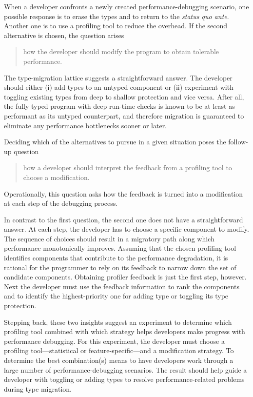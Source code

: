 
When a developer confronts a newly created performance-debugging scenario, one
possible response is to erase the types and to return to the {\em status quo
ante\/}.  Another one is to use a profiling tool to reduce the overhead. If the
second alternative is chosen, the question arises 
\begin{quote} \em

 how the developer should modify the program to obtain tolerable performance.
 
\end{quote}   
The type-migration lattice suggests a straightforward answer.  The developer
should either (i) add types to an untyped component or (ii) experiment with
toggling existing types from deep to shallow protection and vice versa.  After
all, the fully typed program with deep run-time checks is known to be at least
as performant as its untyped counterpart, and therefore migration is guaranteed
to eliminate any performance bottlenecks sooner or later. 

Deciding which of the alternatives to pursue in a given situation poses the
follow-up question 
\begin{quote} \em

how a developer should interpret the feedback from a profiling tool to
choose a modification.

\end{quote}   
Operationally, this question asks how the feedback is turned into a
modification at each step of the debugging process.

In contrast to the first question, the second one does not have a
straightforward answer.  At each step, the developer has to choose a specific
component to modify.  The sequence of choices should result in a migratory path
along which performance monotonically improves. Assuming that the chosen
profiling tool identifies components that contribute to the performance
degradation, it is rational for the programmer to rely on its feedback to narrow
down the set of candidate components.  Obtaining profiler feedback is just the
first step, however. Next the developer must use the feedback information to
rank the components and to identify the highest-priority one for adding type or
toggling its type protection. 

Stepping back, these two insights suggest an experiment to determine which
profiling tool combined with which strategy helps developers make progress with
performance debugging. For this experiment, the developer must choose a
profiling tool---statistical or feature-specific---and a modification strategy.
To determine the best combination(s) means to have developers work through a
large number of performance-debugging scenarios. The result should help guide a
developer with toggling or adding types to resolve performance-related
problems during type migration.


